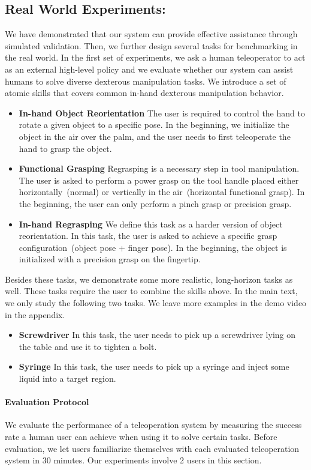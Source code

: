 \subsection{Real World Experiments:}
We have demonstrated that our system can provide effective assistance through simulated validation. Then, we further design several tasks for benchmarking in the real world. In the first set of experiments, we ask a human teleoperator to act as an external high-level policy and we evaluate whether our system can assist humans to solve diverse dexterous manipulation tasks. We introduce a set of atomic skills that covers common in-hand dexterous manipulation behavior.
\begin{itemize}
    \item \textbf{In-hand Object Reorientation} The user is required to control the hand to rotate a given object to a specific pose. In the beginning, we initialize the object in the air over the palm, and the user needs to first teleoperate the hand to grasp the object. 
    
    \item \textbf{Functional Grasping} Regrasping is a necessary step in tool manipulation. The user is asked to perform a power grasp on the tool handle placed either horizontally~(normal) or vertically in the air~(horizontal functional grasp). In the beginning, the user can only perform a pinch grasp or precision grasp.

    \item \textbf{In-hand Regrasping} We define this task as a harder version of object reorientation. In this task, the user is asked to achieve a specific grasp configuration~(object pose + finger pose). In the beginning, the object is initialized with a precision grasp on the fingertip.
\end{itemize}
Besides these tasks, we demonstrate some more realistic, long-horizon tasks as well. These tasks require the user to combine the skills above. In the main text, we only study the following two tasks. We leave more examples in the demo video in the appendix.
\begin{itemize}
    \item \textbf{Screwdriver} In this task, the user needs to pick up a screwdriver lying on the table and use it to tighten a bolt. 
    \item \textbf{Syringe} In this task, the user needs to pick up a syringe and inject some liquid into a target region.
\end{itemize}
\paragraph{Evaluation Protocol} We evaluate the performance of a teleoperation system by measuring the success rate a human user can achieve when using it to solve certain tasks. Before evaluation, we let users familiarize themselves with each evaluated teleoperation system in 30 minutes. Our experiments involve 2 users in this section.

